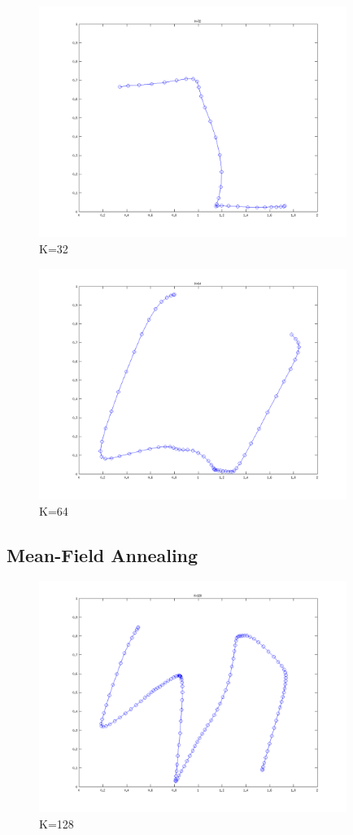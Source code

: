 \documentclass{article}
\begin{document}
		\begin{figure}[H]
			\includegraphics[width=10cm]{k32.png}
			\caption{K=32}
		\end{figure}
		\begin{figure}[H]
			\includegraphics[width=10cm]{k64.png}
			\caption{K=64}
		\end{figure}
	\subsection{Mean-Field Annealing}
		
		\begin{figure}[H]
			\includegraphics[width=10cm]{k128.png}
			\caption{K=128}		
		\end{figure}	
		
\end{document}
